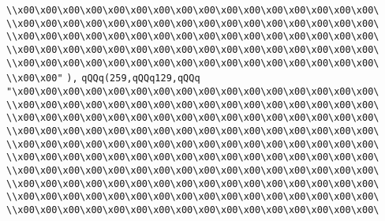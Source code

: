 \verb|\\x00\x00\x00\x00\x00\x00\x00\x00\x00\x00\x00\x00\x00\x00\x00\x00\|\newline
\verb|\\x00\x00\x00\x00\x00\x00\x00\x00\x00\x00\x00\x00\x00\x00\x00\x00\|\newline
\verb|\\x00\x00\x00\x00\x00\x00\x00\x00\x00\x00\x00\x00\x00\x00\x00\x00\|\newline
\verb|\\x00\x00\x00\x00\x00\x00\x00\x00\x00\x00\x00\x00\x00\x00\x00\x00\|\newline
\verb|\\x00\x00\x00\x00\x00\x00\x00\x00\x00\x00\x00\x00\x00\x00\x00\x00\|\newline
\verb|\\x00\x00"|\newline
\verb|),|\newline
\verb|qQQq(259,qQQq129,qQQq|\newline
\verb|"\x00\x00\x00\x00\x00\x00\x00\x00\x00\x00\x00\x00\x00\x00\x00\x00\|\newline
\verb|\\x00\x00\x00\x00\x00\x00\x00\x00\x00\x00\x00\x00\x00\x00\x00\x00\|\newline
\verb|\\x00\x00\x00\x00\x00\x00\x00\x00\x00\x00\x00\x00\x00\x00\x00\x00\|\newline
\verb|\\x00\x00\x00\x00\x00\x00\x00\x00\x00\x00\x00\x00\x00\x00\x00\x00\|\newline
\verb|\\x00\x00\x00\x00\x00\x00\x00\x00\x00\x00\x00\x00\x00\x00\x00\x00\|\newline
\verb|\\x00\x00\x00\x00\x00\x00\x00\x00\x00\x00\x00\x00\x00\x00\x00\x00\|\newline
\verb|\\x00\x00\x00\x00\x00\x00\x00\x00\x00\x00\x00\x00\x00\x00\x00\x00\|\newline
\verb|\\x00\x00\x00\x00\x00\x00\x00\x00\x00\x00\x00\x00\x00\x00\x00\x00\|\newline
\verb|\\x00\x00\x00\x00\x00\x00\x00\x00\x00\x00\x00\x00\x00\x00\x00\x00\|\newline
\verb|\\x00\x00\x00\x00\x00\x00\x00\x00\x00\x00\x00\x00\x00\x00\x00\x00\|\newline
